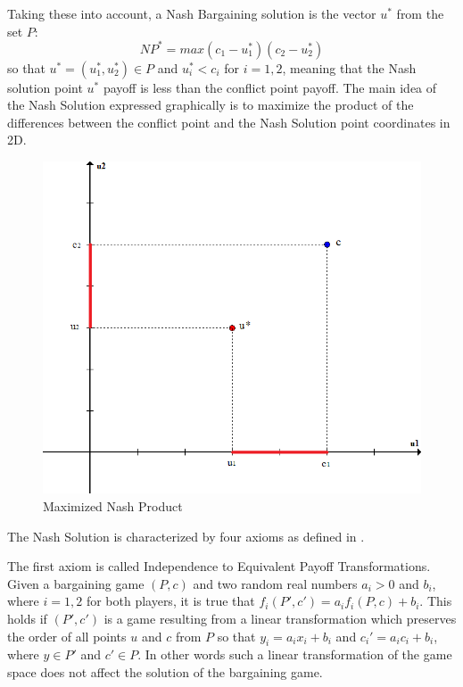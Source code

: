 Taking these into account, a Nash Bargaining solution is the vector $u^*$ from the set $P$:
\[
NP^* = max(c_1 - u_1^* )(c_2 - u_2^*)
\]
so that $u^* = (u_1^*,u_2^*) \in P$ and $u_i^* < c_i$ for $i = 1,2$, meaning that the Nash solution point $u^*$ payoff is less than the conflict point payoff. The main idea of the Nash Solution expressed graphically is to maximize the product of the differences between the conflict point and the Nash Solution point coordinates in 2D.

\begin{figure}[h]
\centering
\includegraphics[scale=0.5]{figures/nashSolution}
\caption{Maximized Nash Product}
\label{fig:nashSol}
\end{figure}

The Nash Solution is characterized by four axioms as defined in \citet{holler2006einfuhrung}. 

The first axiom is called Independence to Equivalent Payoff Transformations. Given a bargaining game $(P,c)$ and two random real numbers $a_i > 0$ and $b_i$, where $i = 1,2$ for both players, it is true that $f_i(P',c') = a_i f_i(P,c) + b_i$. This holds if $(P',c')$ is a game resulting from a linear transformation which preserves the order of all points $u$ and $c$ from $P$ so that $y_i = a_i x_i + b_i$ and $c_i' = a_i c_i + b_i$, where $y \in P'$ and $c' \in P$. In other words such a linear transformation of the game space does not affect the solution of the bargaining game.

